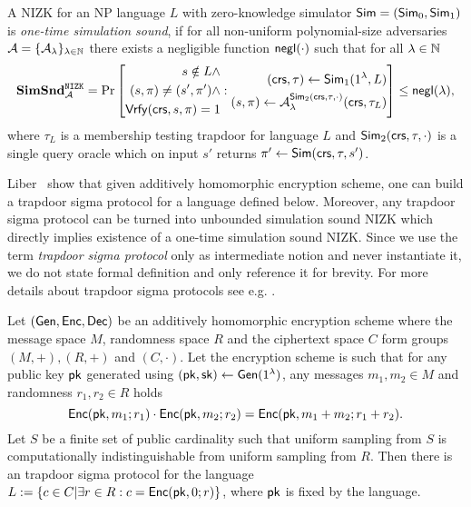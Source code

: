 \begin{definition}\label{def:simsnd}
A NIZK for an NP language $L$ with zero-knowledge simulator $\mathsf{Sim} = (\mathsf{Sim}_0, \mathsf{Sim}_1)$ is \emph{one-time simulation sound}, if for all non-uniform polynomial-size adversaries $\mathcal{A} = \{\mathcal{A}_{\lambda}\}_{\lambda \in \mathbb{N}}$ there exists a negligible function $\mathsf{negl}(\cdot)$ such that for all $\lambda \in \mathbb{N}$ 
\[
\mathbf{SimSnd}_{\mathcal{A}}^{\mathtt{NIZK}} = \Pr\left[
\begin{aligned}
s \notin L \land \\
(s, \pi) \neq (s', \pi') \land \\
\mathsf{Vrfy}(\mathsf{crs}, s, \pi) = 1
\end{aligned}
:
\begin{aligned}
(\mathsf{crs}, \tau) \leftarrow \mathsf{Sim}_1(1{^{\lambda}}, L) \\
(s, \pi) \leftarrow \mathcal{A}_{\lambda}^{\mathsf{Sim}_2(\mathsf{crs}, \tau, \cdot)}(\mathsf{crs}, \tau_L)
\end{aligned} \right] \leq \mathsf{negl}(\lambda),
\]
where $\tau_L$ is a membership testing trapdoor for language $L$ and $\mathsf{Sim}_2(\mathsf{crs}, \tau, \cdot)$ is a single query oracle which on input $s'$ returns $\pi' \leftarrow \mathsf{Sim}(\mathsf{crs}, \tau, s')$.
\end{definition}

Liber~\etal \cite{Libert2021OneShotFN} show that given additively homomorphic encryption scheme, one can build a trapdoor sigma protocol for a language defined below. Moreover, any trapdoor sigma protocol can be turned into unbounded simulation sound NIZK which directly implies existence of a one-time simulation sound NIZK. Since we use the term \emph{trapdoor sigma protocol} only as intermediate notion and never instantiate it, we do not state formal definition and only reference it for brevity. For more details about trapdoor sigma protocols see e.g. \cite{Libert2021OneShotFN}. 

\begin{lemma}\label{lem:tsp}
Let $(\mathsf{Gen}, \mathsf{Enc}, \mathsf{Dec})$ be an additively homomorphic encryption scheme where the message space $M$, randomness space $R$ and the ciphertext space $C$ form groups $(M, +), (R,+)$ and $(C, \cdot)$. Let the encryption scheme is such that for any public key $\mathsf{pk}$ generated using $(\mathsf{pk}, \mathsf{sk}) \leftarrow \mathsf{Gen}(1{^{\lambda}})$, any messages $m_1, m_2 \in M$ and randomness $r_1, r_2 \in R$ holds
\[\mathsf{Enc}(\mathsf{pk}, m_1;r_1) \cdot \mathsf{Enc}(\mathsf{pk}, m_2;r_2) = \mathsf{Enc}(\mathsf{pk}, m_1+m_2; r_1+r_2).\]
Let $S$ be a finite set of public cardinality such that uniform sampling from $S$ is computationally indistinguishable from uniform sampling from $R$. 
Then there is an trapdoor sigma protocol for the language $L:= \{c \in C| \exists r \in R: c = \mathsf{Enc}(\mathsf{pk}, 0; r)\}$, where $\mathsf{pk}$ is fixed by the language.  
\end{lemma}


